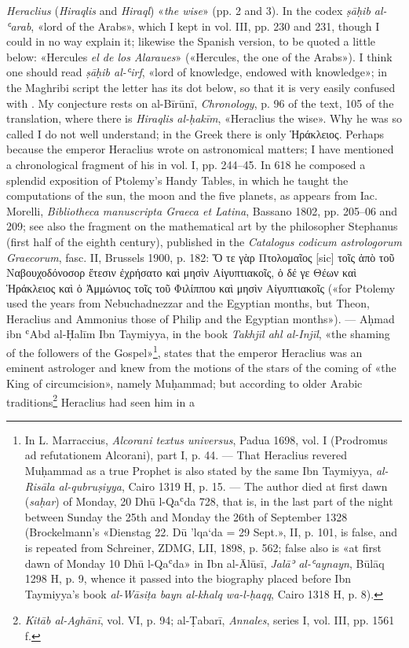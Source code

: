 \documentclass[11pt]{article}
\newcommand{\Pg}[1]{\marginpar{\footnotesize\color{gray}#1}}
\begin{document}
\par \Pg{II 196}\Pg{II 197}\emph{Heraclius} (\emph{Hiraqlis} and \emph{Hiraql}) «\emph{the wise}» (pp. 2 and 3). In the codex  \emph{ṣāḥib al-ʿarab}, «lord of the Arabs», which I kept in vol. III, pp. 230 and 231, though I could in no way explain it; likewise the Spanish version, to be quoted a little below: «Hercules \emph{el de los Alaraues}» («Hercules, the one of the Arabs»). I think one should read  \emph{ṣāḥib al-ʿirf}, «lord of knowledge, endowed with knowledge»; in the Maghribi script the letter  has its dot below, so that it is very easily confused with . My conjecture rests on al-Bīrūnī, \emph{Chronology}, p. 96 of the text, 105 of the translation, where there is \emph{Hiraqlis al-ḥakīm}, «Heraclius the wise». Why he was so called I do not well understand; in the Greek there is only {\greekfont Ἡράκλειος}. Perhaps because the emperor Heraclius wrote on astronomical matters; I have mentioned a chronological fragment of his in vol. I, pp. 244–45. In 618 he composed a splendid exposition of Ptolemy's Handy Tables, in which he taught the computations of the sun, the moon and the five planets, as appears from Iac. Morelli, \emph{Bibliotheca manuscripta Graeca et Latina}, Bassano 1802, pp. 205–06 and 209; see also the fragment on the mathematical art by the philosopher Stephanus (first half of the eighth century), published in the \emph{Catalogus codicum astrologorum Graecorum}, fasc. II, Brussels 1900, p. 182: {\greekfont Ὅ τε γὰρ Πτολομαῖος} [sic] {\greekfont τοῖς ἀπὸ τοῦ Ναβουχοδόνοσορ ἔτεσιν ἐχρήσατο καὶ μησὶν Αἰγυπτιακοῖς, ὁ δέ γε Θέων καὶ Ἡράκλειος καὶ ὁ Ἀμμώνιος τοῖς τοῦ Φιλίππου καὶ μησὶν Αἰγυπτιακοῖς} («for Ptolemy used the years from Nebuchadnezzar and the Egyptian months, but Theon, Heraclius and Ammonius those of Philip and the Egyptian months»). — Aḥmad ibn ʿAbd al-Ḥalīm Ibn Taymiyya, in the book \emph{Takhjīl ahl al-Injīl}, «the shaming of the followers of the Gospel»\footnote{In L. Marraccius, \emph{Alcorani textus universus}, Padua 1698, vol. I (Prodromus ad refutationem Alcorani), part I, p. 44. — That Heraclius revered Muḥammad as a true Prophet is also stated by the same Ibn Taymiyya, \emph{al-Risāla al-qubruṣiyya}, Cairo 1319 H, p. 15. — The author died at first dawn (\emph{saḥar}) of Monday, 20 Dhū l-Qaʿda 728, that is, in the last part of the night between Sunday the 25th and Monday the 26th of September 1328 (Brockelmann's «Dienstag 22. Dū ’lqa‘da = 29 Sept.», II, p. 101, is false, and is repeated from Schreiner, ZDMG, LII, 1898, p. 562; false also is «at first dawn of Monday 10 Dhū l-Qaʿda» in Ibn al-Ālūsī, \emph{Jalāʾ al-ʿaynayn}, Būlāq 1298 H, p. 9, whence it passed into the biography placed before Ibn Taymiyya's book \emph{al-Wāsiṭa bayn al-khalq wa-l-ḥaqq}, Cairo 1318 H, p. 8).}, states that the emperor Heraclius was an eminent astrologer and knew from the motions of the stars of the coming of «the King of circumcision», namely Muḥammad; but according to older Arabic traditions\footnote{\emph{Kitāb al-Aghānī}, vol. VI, p. 94; al-Ṭabarī, \emph{Annales}, series I, vol. III, pp. 1561 f.} Heraclius had seen him in a 
\end{document}
